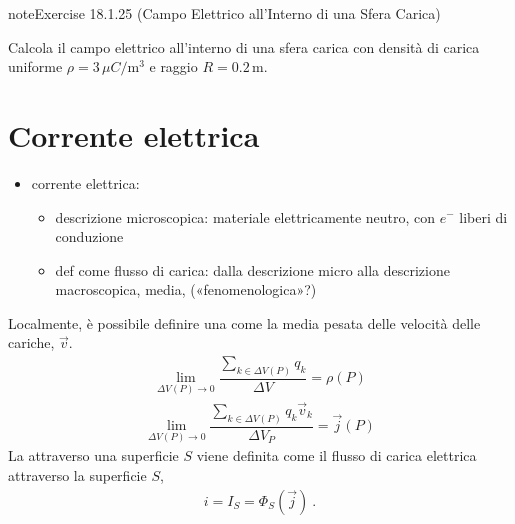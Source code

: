 \documentclass[letterpaper,10pt,italian]{jupyterBook}
\begin{document}
\begin{sphinxadmonition}{note}{Exercise 18.1.25 (Campo Elettrico all’Interno di una Sfera Carica)}



\sphinxAtStartPar
Calcola il campo elettrico all’interno di una sfera carica con densità di carica uniforme \(\rho = 3 \, \mu C/\text{m}^3\) e raggio \(R = 0.2 \, \text{m}\).
\end{sphinxadmonition}



\begin{sphinxVerbatim}[commandchars=\\\{\}]

\end{sphinxVerbatim}

\sphinxstepscope


\section{Corrente elettrica}
\label{\detokenize{ch/electromagnetism/electric-current:corrente-elettrica}}\label{\detokenize{ch/electromagnetism/electric-current:physics-hs-electromagnetism-electric-current}}\label{\detokenize{ch/electromagnetism/electric-current::doc}}\begin{itemize}
\item {} 
\sphinxAtStartPar
corrente elettrica:
\begin{itemize}
\item {} 
\sphinxAtStartPar
descrizione microscopica: materiale elettricamente neutro, con \(e^-\) liberi di conduzione

\item {} 
\sphinxAtStartPar
def come flusso di carica: dalla descrizione micro alla descrizione macroscopica, media, («fenomenologica»?)

\end{itemize}

\end{itemize}

\sphinxAtStartPar
Localmente, è possibile definire una  come la media pesata delle velocità delle cariche, \(\vec{v}\).
\begin{equation*}
\begin{split}\lim_{\Delta V(P) \rightarrow 0} \dfrac{\sum_{k \in \Delta V(P)} q_k}{\Delta V} = \rho(P)\end{split}
\end{equation*}\begin{equation*}
\begin{split}\lim_{\Delta V(P) \rightarrow 0} \dfrac{\sum_{k \in \Delta V(P)} q_k \vec{v}_k}{\Delta V_P} = \vec{j}(P)\end{split}
\end{equation*}
\sphinxAtStartPar
La  attraverso una superficie \(S\) viene definita come il flusso di carica elettrica attraverso la superficie \(S\),
\begin{equation*}
\begin{split}i = I_{S} = \Phi_{S}(\vec{j}) \ .\end{split}
\end{equation*}
\end{document}
